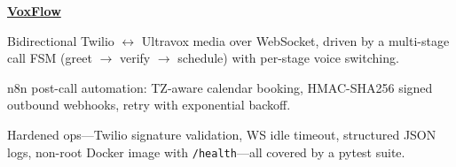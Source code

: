 \begin{twocolentry}{}
\href{https://github.com/faketut/VoxFlow}{\textbf{VoxFlow}}
\end{twocolentry}
\begin{onecolentry}
\begin{highlights}
\item Bidirectional Twilio $\leftrightarrow$ Ultravox media over WebSocket, driven by a multi-stage call FSM (greet $\rightarrow$ verify $\rightarrow$ schedule) with per-stage voice switching.
\item n8n post-call automation: TZ-aware calendar booking, HMAC-SHA256 signed outbound webhooks, retry with exponential backoff.
\item Hardened ops---Twilio signature validation, WS idle timeout, structured JSON logs, non-root Docker image with \texttt{/health}---all covered by a pytest suite.
\end{highlights}
\end{onecolentry}
